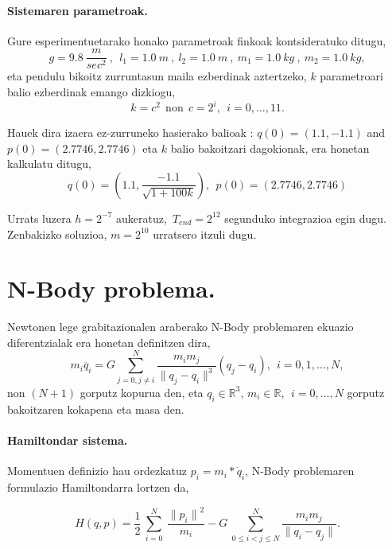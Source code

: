 \paragraph*{Sistemaren parametroak.} 
Gure esperimentuetarako honako parametroak finkoak kontsideratuko ditugu,
\begin{equation*}
 \label{eq:17}
g=9.8 \ \frac{m}{sec^2}\ ,\ \ l_1=1.0 \ m \ , \ l_2=1.0 \ m\ , \ m_1=1.0 \ kg\ , \ m_2=1.0 \ kg,
\end{equation*} 
eta  pendulu bikoitz zurruntasun maila ezberdinak aztertzeko, $k$ parametroari balio ezberdinak emango dizkiogu, 
\begin{equation*}
k=c^{2} \ \ \text{non} \ \ c=2^{i}, \ \ i=0,\dots,11.
\end{equation*}  

Hauek dira izaera ez-zurruneko hasierako balioak \cite{Dumitru} :  $q(0)=(1.1, -1.1)$ and $p(0)=(2.7746,2.7746)$
eta $k$ balio bakoitzari dagokionak, era honetan kalkulatu ditugu,
\begin{equation*}
q(0)=\left(1.1, \frac{-1.1}{\sqrt{1+100k}}\right), \ \ 
p(0)=(2.7746,2.7746)
\end{equation*}

Urrats luzera $h=2^{-7}$ aukeratuz,~$T_{end}=2^{12}$ segunduko integrazioa egin dugu. Zenbakizko soluzioa, $m=2^{10}$ urratsero itzuli dugu.   

\section{N-Body problema.}

Newtonen lege grabitazionalen araberako N-Body problemaren ekuazio diferentzialak era honetan definitzen dira,
\begin{equation}
m_i\ddot{q_i}= G \sum_{j=0,j \neq i}^{N} \frac{m_im_j}{\|q_j-q_i\|^3} (q_j-q_i) , \ \  i=0,1,\dots, N,
\end{equation}
non $(N+1)$ gorputz kopurua den, eta $q_i\in \mathbb{R}^3$, $m_i \in \mathbb{R}, \ \ i=0,\dots,N$ gorputz bakoitzaren kokapena eta masa den. 

\paragraph*{Hamiltondar sistema.}
Momentuen definizio hau ordezkatuz  $p_i=m_i*\dot{q}_i$, N-Body problemaren formulazio Hamiltondarra  lortzen da,  

\begin{equation}
H(q,p)=\frac{1}{2}\ \sum^N_{i=0}{\ \frac{{\|p_i\|}^2}{m_i}}-G\ \sum^N_{0\le i<j\le N}{\frac{m_im_j}{\|q_i-q_j\|}}. 
\end{equation}

